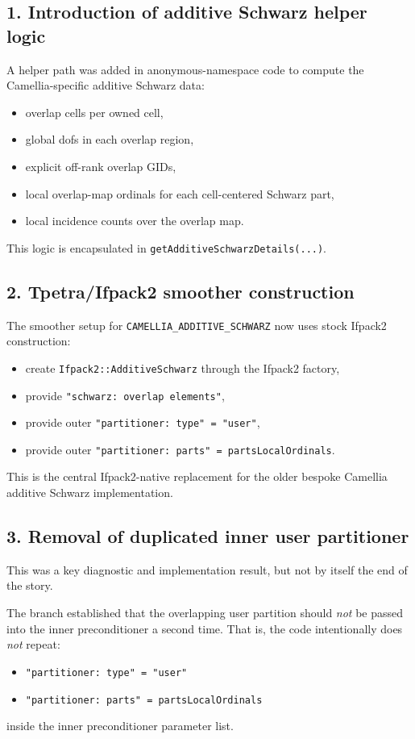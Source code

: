 \documentclass[11pt]{article}
\begin{document}
\subsection{1. Introduction of additive Schwarz helper logic}
A helper path was added in anonymous-namespace code to compute the Camellia-specific additive Schwarz data:
\begin{itemize}
  \item overlap cells per owned cell,
  \item global dofs in each overlap region,
  \item explicit off-rank overlap GIDs,
  \item local overlap-map ordinals for each cell-centered Schwarz part,
  \item local incidence counts over the overlap map.
\end{itemize}

This logic is encapsulated in \texttt{getAdditiveSchwarzDetails(...)}.

\subsection{2. Tpetra/Ifpack2 smoother construction}
The smoother setup for \texttt{CAMELLIA\_ADDITIVE\_SCHWARZ} now uses stock Ifpack2 construction:
\begin{itemize}
  \item create \texttt{Ifpack2::AdditiveSchwarz} through the Ifpack2 factory,
  \item provide \texttt{"schwarz: overlap elements"},
  \item provide outer \texttt{"partitioner: type" = "user"},
  \item provide outer \texttt{"partitioner: parts" = partsLocalOrdinals}.
\end{itemize}

This is the central Ifpack2-native replacement for the older bespoke Camellia additive Schwarz implementation.

\subsection{3. Removal of duplicated inner user partitioner}
This was a key diagnostic and implementation result, but not by itself the end of the story.

The branch established that the overlapping user partition should \emph{not} be passed into the inner preconditioner a second time. That is, the code intentionally does \emph{not} repeat:
\begin{itemize}
  \item \texttt{"partitioner: type" = "user"}
  \item \texttt{"partitioner: parts" = partsLocalOrdinals}
\end{itemize}
inside the inner preconditioner parameter list.
\end{document}
